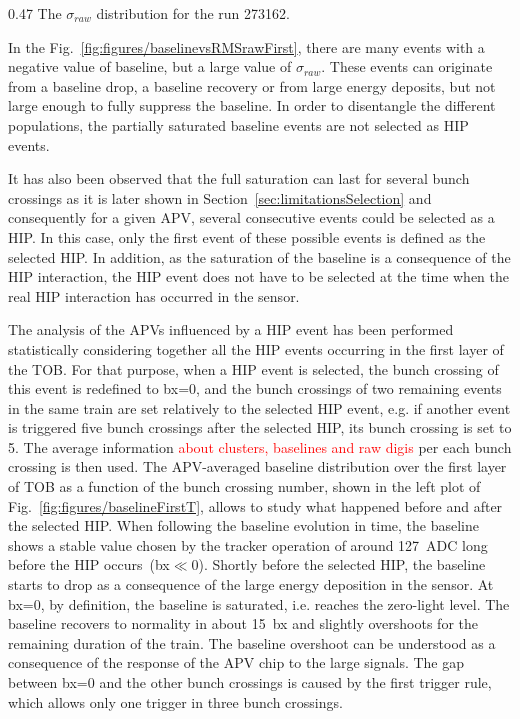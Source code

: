                 {0.47}       %
                 {The $\sigma_{raw}$ distribution for the run 273162. }

In the Fig.~\ref{fig:figures/baselinevsRMSrawFirst}, there are many events with a negative value of baseline, but a large value of $\sigma_{raw}$. These events can originate from a baseline drop, a baseline recovery or from large energy deposits, but not large enough to fully suppress the baseline. In order to  disentangle the different populations, the partially saturated baseline events are not selected as HIP events. 

It has also been observed that the full saturation can last for several bunch crossings as it is later shown in Section~\ref{sec:limitationsSelection} and consequently for a given APV, several consecutive events could be selected as a HIP. In this case, only the first event of these possible events is defined as the selected HIP. In addition, as the saturation of the baseline is a consequence of the HIP interaction, the HIP event does not have to be selected at the time when the real HIP interaction has occurred in the sensor. 


The analysis of the APVs influenced by a HIP event has been performed statistically considering together all the HIP events occurring in the first layer of the TOB. For that purpose, when a HIP event is selected, the bunch crossing of this event is redefined to bx=0, and the bunch crossings of two remaining events in the same train are set relatively to the selected HIP event, e.g. if another event is triggered five bunch crossings after the selected HIP, its bunch crossing is set to 5. The average information \textcolor{red}{about clusters, baselines and raw digis} per each bunch crossing is then used. The APV-averaged baseline distribution over the first layer of TOB as a function of the bunch crossing number, shown in the left plot of Fig.~\ref{fig:figures/baselineFirstT}, allows to study what happened before and after the selected HIP. When following the baseline evolution in time, the baseline shows a stable value chosen by the tracker operation of around 127~ADC long before the HIP occurs~(bx$\ll$0). Shortly before the selected HIP, the baseline starts to drop as a consequence of the large energy deposition in the sensor. At bx=0, by definition, the baseline is saturated, i.e. reaches the zero-light level. The baseline recovers to normality in about 15~bx and slightly overshoots for the remaining duration of the train. The baseline overshoot can be understood as a consequence of the response of the APV chip to the large signals. The gap between bx=0 and the other bunch crossings is caused by the first trigger rule, which allows only one trigger in three bunch crossings. 

